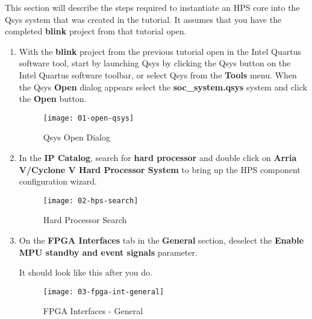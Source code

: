 \begin{flushleft}
\noindent

This section will describe the steps required to instantiate an HPS core into the Qsys system that was created in the  tutorial.  It assumes that you have the completed \textbf{blink} project from that tutorial open.

\begin{enumerate}[
	label=\textbf{Step \arabic*.},
	leftmargin=*,
	widest={00},
	align=left]

\item With the \textbf{blink} project from the previous tutorial open in the Intel Quartus software tool, start by launching Qsys by clicking the Qsys button on the Intel Quartus software toolbar, or select Qsys from the \textbf{Tools} menu.  When the Qsys \textbf{Open} dialog appears select the \textbf{soc\_system.qsys} system and click the \textbf{Open} button.

\begin{figure}[H]
\centering
\texttt{[image: 01-open-qsys]}
\caption{Qsys Open Dialog}
\label{fig:01-open-qsys}
\end{figure}

\item In the \textbf{IP Catalog}, search for \textbf{hard processor} and double click on \textbf{Arria V/Cyclone V Hard Processor System} to bring up the HPS component configuration wizard.

\begin{figure}[H]
\centering
\texttt{[image: 02-hps-search]}
\caption{Hard Processor Search}
\label{fig:02-hps-search}
\end{figure}

\newpage

\item On the \textbf{FPGA Interfaces} tab in the \textbf{General} section, deselect the \textbf{Enable MPU standby and event signals} parameter.

It should look like this after you do.

\begin{figure}[H]
\centering
\texttt{[image: 03-fpga-int-general]}
\caption{FPGA Interfaces - General}
\label{fig:03-fpga-int-general}
\end{figure}


\end{enumerate}
\end{flushleft}

